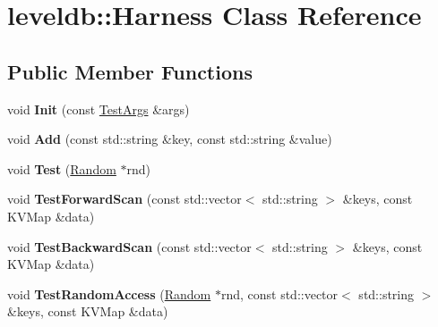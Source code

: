 \hypertarget{classleveldb_1_1_harness}{}\section{leveldb\+:\+:Harness Class Reference}
\label{classleveldb_1_1_harness}
\subsection*{Public Member Functions}
\begin{DoxyCompactItemize}
\item 
\mbox{\label{classleveldb_1_1_harness_a2aba24255691eaad2a57ee43cbc9ddc1}} 
void {\bfseries Init} (const \mbox{\hyperlink{structleveldb_1_1_test_args}{Test\+Args}} \&args)
\item 
\mbox{\label{classleveldb_1_1_harness_a019ddc8e52dc5cfaac85f53993ab1ed4}} 
void {\bfseries Add} (const std\+::string \&key, const std\+::string \&value)
\item 
\mbox{\label{classleveldb_1_1_harness_a78dbb5352b51e22bbc449bad7c1a9176}} 
void {\bfseries Test} (\mbox{\hyperlink{classleveldb_1_1_random}{Random}} $\ast$rnd)
\item 
\mbox{\label{classleveldb_1_1_harness_ac5ff108406a08a6e3e22318246d206ef}} 
void {\bfseries Test\+Forward\+Scan} (const std\+::vector$<$ std\+::string $>$ \&keys, const K\+V\+Map \&data)
\item 
\mbox{\label{classleveldb_1_1_harness_aba7a2c48101cd9d024be64080ebed363}} 
void {\bfseries Test\+Backward\+Scan} (const std\+::vector$<$ std\+::string $>$ \&keys, const K\+V\+Map \&data)
\item 
\mbox{\label{classleveldb_1_1_harness_adb4b24bd89b600a67b0cd52ff64af9cd}} 
void {\bfseries Test\+Random\+Access} (\mbox{\hyperlink{classleveldb_1_1_random}{Random}} $\ast$rnd, const std\+::vector$<$ std\+::string $>$ \&keys, const K\+V\+Map \&data)
\item 
\mbox{\label{classleveldb_1_1_harness_a69962f92cdd4fdc5d1f91d8c3cbebb3f}} 

\end{DoxyCompactItemize}
